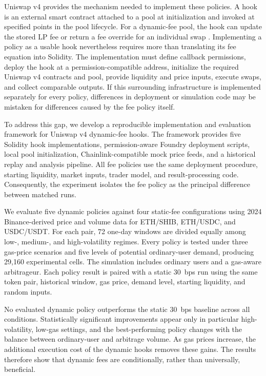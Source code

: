 \documentclass[a4paper,conference]{IEEEtran}
\begin{document}
Uniswap v4 provides the mechanism needed to implement these policies. A hook is an external smart contract attached to a pool at initialization and invoked at specified points in the pool lifecycle. For a dynamic-fee pool, the hook can update the stored LP fee or return a fee override for an individual swap \cite{adams2024uniswapv4,uniswapDynamicFees}. Implementing a policy as a usable hook nevertheless requires more than translating its fee equation into Solidity. The implementation must define callback permissions, deploy the hook at a permission-compatible address, initialize the required Uniswap v4 contracts and pool, provide liquidity and price inputs, execute swaps, and collect comparable outputs. If this surrounding infrastructure is implemented separately for every policy, differences in deployment or simulation code may be mistaken for differences caused by the fee policy itself.

To address this gap, we develop a reproducible implementation and evaluation framework for Uniswap v4 dynamic-fee hooks. The framework provides five Solidity hook implementations, permission-aware Foundry deployment scripts, local pool initialization, Chainlink-compatible mock price feeds, and a historical replay and analysis pipeline. All fee policies use the same deployment procedure, starting liquidity, market inputs, trader model, and result-processing code. Consequently, the experiment isolates the fee policy as the principal difference between matched runs.

We evaluate five dynamic policies against four static-fee configurations using 2024 Binance-derived price and volume data for ETH/SHIB, ETH/USDC, and USDC/USDT. For each pair, 72 one-day windows are divided equally among low-, medium-, and high-volatility regimes. Every policy is tested under three gas-price scenarios and five levels of potential ordinary-user demand, producing 29{,}160 experimental cells. The simulation includes ordinary users and a gas-aware arbitrageur. Each policy result is paired with a static 30~bps run using the same token pair, historical window, gas price, demand level, starting liquidity, and random inputs.

No evaluated dynamic policy outperforms the static 30~bps baseline across all conditions. Statistically significant improvements appear only in particular high-volatility, low-gas settings, and the best-performing policy changes with the balance between ordinary-user and arbitrage volume. As gas prices increase, the additional execution cost of the dynamic hooks removes these gains. The results therefore show that dynamic fees are conditionally, rather than universally, beneficial.
\end{document}
